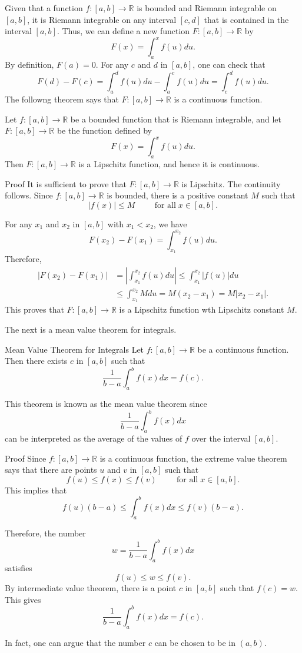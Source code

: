  Given that a function $f:[a,b]\to\mathbb{R}$ is bounded and Riemann integrable on $[a,b]$, it is Riemann integrable on any interval $[c,d]$ that is contained in the interval $[a,b]$. Thus,  we can define a new function $F:[a,b]\to\mathbb{R}$ by
\[F(x)=\int_a^x f(u)du.\]
By definition, $F(a)=0$. 
For any $c$ and $d$ in $[a, b]$, one can check that
\[F(d)-F(c)=\int_a^df(u)du-\int_a^cf(u)du=\int_c^df(u)du.\]
The followng theorem says that  $F:[a,b]\to\mathbb{R}$ is a continuous function.
\begin{theorem}[label=230222_11]{}
Let $f:[a,b]\to\mathbb{R}$ be a bounded function that is Riemann integrable, and let $F:[a,b]\to\mathbb{R}$ be the function defined by \[F(x)=\int_a^x f(u)du.\]Then $F:[a,b]\to\mathbb{R}$ is a Lipschitz function, and hence it is continuous.
\end{theorem}
\begin{myproof}{Proof}
It is sufficient to prove that $F:[a,b]\to\mathbb{R}$ is Lipschitz. The continuity follows. Since $f:[a,b]\to\mathbb{R}$ is bounded, there is a positive constant $M$ such that
\[|f(x)|\leq M\hspace{1cm}\text{for all}\;x\in [a,b].\]\bp

For any $x_1$ and $x_2$ in $[a,b]$ with $x_1<x_2$, we have
\[ F(x_2)-F(x_1)= \int_{x_1}^{x_2}f(u)du.\]
Therefore,
\begin{align*}
|F(x_2)-F(x_1)|&=\left|\int_{x_1}^{x_2}f(u)du\right|\leq \int_{x_1}^{x_2}|f(u)|du\\&\leq \int_{x_1}^{x_2}Mdu=M(x_2-x_1)=M|x_2-x_1|.
\end{align*}This proves that $F:[a,b]\to\mathbb{R}$ is a Lipschitz function wth Lipschitz constant $M$. 
\end{myproof}


The next is a mean value theorem for integrals.
\begin{theorem}{Mean Value Theorem for Integrals}
Let $f:[a,b]\to\mathbb{R}$ be a continuous function. Then there exists $c$ in $[a,b]$ such that
\[\frac{1}{b-a}\int_a^bf(x)dx=f(c).\]
\end{theorem}This theorem is known as the mean value theorem since 
\[\frac{1}{b-a}\int_a^bf(x)dx\]can be interpreted as the average of the values of $f$ over the interval $[a,b]$. 
\begin{myproof}{Proof}
Since $f:[a,b]\to\mathbb{R}$ is a continuous function, the extreme value theorem says that there are points $u$ and $v$ in $[a,b]$ such that
\[f(u)\leq f(x)\leq f(v)\hspace{1cm}\text{for all}\;x\in [a,b].\]This implies that
\[f(u)(b-a)\leq \int_a^b f(x)dx\leq f(v)(b-a).\]\bp

Therefore, the number
\[w=\frac{1}{b-a}\int_a^bf(x)dx\]satisfies
\[f(u)\leq w\leq f(v).\]
By intermediate value theorem, there is a point $c$ in $[a,b]$ such that $f(c)=w$. This gives
\[\frac{1}{b-a}\int_a^bf(x)dx=f(c).\]
\end{myproof}
In fact, one can argue that the number $c$ can be chosen to be in  $(a,b)$.  

